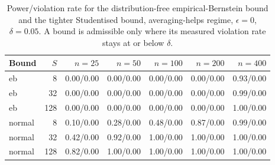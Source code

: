 \begin{table}[h]\centering\small
\begin{tabular}{lrrrrrr}
\toprule
Bound & $S$ & $n{=}25$ & $n{=}50$ & $n{=}100$ & $n{=}200$ & $n{=}400$ \\
\midrule
eb & 8 & 0.00/0.00 & 0.00/0.00 & 0.00/0.00 & 0.00/0.00 & 0.93/0.00 \\
eb & 32 & 0.00/0.00 & 0.00/0.00 & 0.00/0.00 & 0.00/0.00 & 0.99/0.00 \\
eb & 128 & 0.00/0.00 & 0.00/0.00 & 0.00/0.00 & 0.00/0.00 & 1.00/0.00 \\
normal & 8 & 0.10/0.00 & 0.28/0.00 & 0.48/0.00 & 0.87/0.00 & 0.99/0.00 \\
normal & 32 & 0.42/0.00 & 0.92/0.00 & 1.00/0.00 & 1.00/0.00 & 1.00/0.00 \\
normal & 128 & 0.82/0.00 & 1.00/0.00 & 1.00/0.00 & 1.00/0.00 & 1.00/0.00 \\
\bottomrule\end{tabular}
\caption{Power/violation rate for the distribution-free empirical-Bernstein bound and the tighter Studentised bound, averaging-helps regime, $\epsilon=0$, $\delta=0.05$. A bound is admissible only where its measured violation rate stays at or below $\delta$.}
\label{tab:bound}
\end{table}
